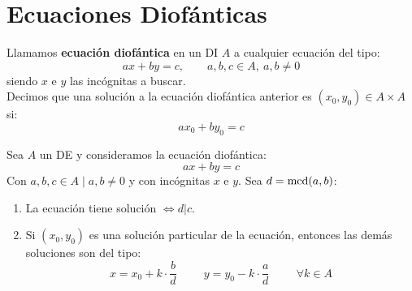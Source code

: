 \section{Ecuaciones Diofánticas}
\begin{definicion}
    Llamamos \textbf{ecuación diofántica} en un DI $A$ a cualquier ecuación del tipo:
    $$ax + by = c, \qquad a,b,c\in A,~a,b\neq 0$$
    siendo $x$ e $y$ las incógnitas a buscar.\\

    
    Decimos que una solución a la ecuación diofántica anterior es $(x_0, y_0)\in A\times A$ si:
    $$ax_0 + by_0 = c$$
\end{definicion}

\begin{teo}
    Sea $A$ un DE y consideramos la ecuación diofántica:
    $$ax + by = c$$
    Con $a,b,c \in A \mid a,b\neq 0$ y con incógnitas $x$ e $y$. Sea $d = \operatorname{mcd}(a,b)$:
    \begin{enumerate}
        \item La ecuación tiene solución $\Longleftrightarrow d|c$.
        \item Si $(x_0, y_0)$ es una solución particular de la ecuación, entonces las demás soluciones son del tipo:
        $$x=x_0 + k\cdot\dfrac{b}{d}\hspace{1cm}y = y_0 - k\cdot \dfrac{a}{d}\hspace{1cm}\forall k \in A$$
    \end{enumerate}
\end{teo}
